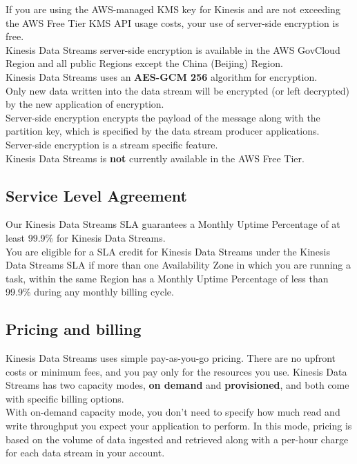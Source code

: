 \documentclass[12pt, letterpaper, twoside]{article}
\begin{document}
If you are using the AWS-managed KMS key for Kinesis and are not exceeding the AWS Free Tier KMS API usage costs, your use of server-side 
encryption is free.\\

Kinesis Data Streams server-side encryption is available in the AWS GovCloud Region and all public Regions except the China (Beijing)
Region.\\

Kinesis Data Streams uses an \textbf{AES-GCM 256} algorithm for encryption.\\

Only new data written into the data stream will be encrypted (or left decrypted) by the new application of encryption.\\

Server-side encryption encrypts the payload of the message along with the partition key, which is specified by the data stream producer 
applications.\\
Server-side encryption is a stream specific feature.\\

Kinesis Data Streams is \textbf{not} currently available in the AWS Free Tier.

\subsection{Service Level Agreement}
Our Kinesis Data Streams SLA guarantees a Monthly Uptime Percentage of at least 99.9\% for Kinesis Data Streams.\\

You are eligible for a SLA credit for Kinesis Data Streams under the Kinesis Data Streams SLA if more than one Availability Zone in 
which you are running a task, within the same Region has a Monthly Uptime Percentage of less than 99.9\% during any monthly billing cycle.\\

\subsection{Pricing and billing}
Kinesis Data Streams uses simple pay-as-you-go pricing. There are no upfront costs or minimum fees, and you pay only for the resources you use.
Kinesis Data Streams has two capacity modes, \textbf{on demand} and \textbf{provisioned}, and both come with specific billing options.\\

With on-demand capacity mode, you don’t need to specify how much read and write throughput you expect your application to perform. In 
this mode, pricing is based on the volume of data ingested and retrieved along with a per-hour charge for each data stream in your account.\\
\end{document}
